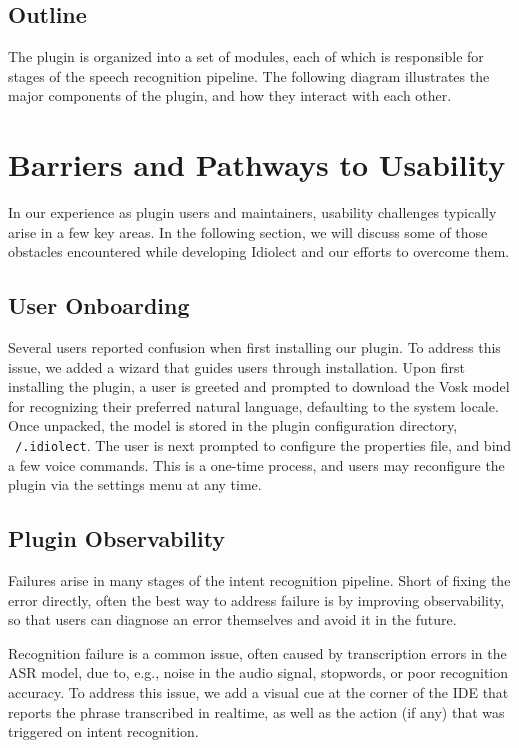 \documentclass[conference]{IEEEtran}
\begin{document}
\subsection{Outline}

The plugin is organized into a set of modules, each of which is responsible for stages of the speech recognition pipeline. The following diagram illustrates the major components of the plugin, and how they interact with each other.


\pagebreak\section{Barriers and Pathways to Usability}\label{sec:usability}

In our experience as plugin users and maintainers, usability challenges typically arise in a few key areas. In the following section, we will discuss some of those obstacles encountered while developing Idiolect and our efforts to overcome them.

\subsection{User Onboarding}

Several users reported confusion when first installing our plugin. To address this issue, we added a wizard that guides users through installation. Upon first installing the plugin, a user is greeted and prompted to download the Vosk model for recognizing their preferred natural language, defaulting to the system locale. Once unpacked, the model is stored in the plugin configuration directory, \texttt{~/.idiolect}. The user is next prompted to configure the properties file, and bind a few voice commands. This is a one-time process, and users may reconfigure the plugin via the settings menu at any time.

\subsection{Plugin Observability}

Failures arise in many stages of the intent recognition pipeline. Short of fixing the error directly, often the best way to address failure is by improving observability, so that users can diagnose an error themselves and avoid it in the future.

Recognition failure is a common issue, often caused by transcription errors in the ASR model, due to, e.g., noise in the audio signal, stopwords, or poor recognition accuracy. To address this issue, we add a visual cue at the corner of the IDE that reports the phrase transcribed in realtime, as well as the action (if any) that was triggered on intent recognition.
\end{document}
